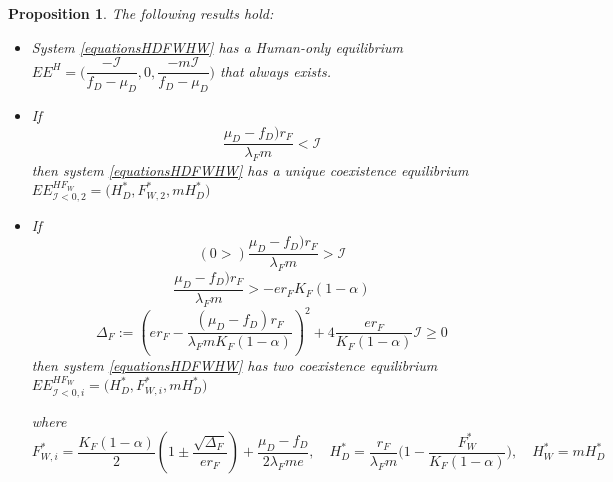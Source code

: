 \documentclass{article}
\newcommand{\lfw}{\lambda_{F}}
\newcommand{\lfw}{\lambda_{F}}
\newcommand{\cI}{\mathcal{I}}
\newtheorem{prop}{Proposition}
\begin{document}
\begin{prop} The following results hold:
\begin{itemize}
\item System \eqref{equationsHDFWHW} has a Human-only equilibrium $EE^{H} = \Big(\dfrac{-\cI}{f_D - \mu_D}, 0, \dfrac{- m \cI}{f_D - \mu_D} \Big)$ that always exists.
\item If $$ \dfrac{\mu_D - f_D)r_F}{\lfw m} < \cI $$ then system \eqref{equationsHDFWHW} has a unique coexistence equilibrium $EE^{HF_W}_{\cI < 0, 2} = \Big(H^*_{D}, F^*_{W, 2}, m H^*_{D} \Big)$

\item If $$(0 > )\dfrac{\mu_D - f_D)r_F}{\lfw m} > \cI $$ 
$$ \dfrac{\mu_D - f_D)r_F}{\lfw m} > - e r_F K_F(1-\alpha)$$
$$ \Delta_F := \left(er_F - \dfrac{(\mu_D - f_D) r_F}{\lfw m K_F(1-\alpha)} \right)^2 + 4\dfrac{er_F}{K_F(1-\alpha)}  \cI \geq 0$$
then system \eqref{equationsHDFWHW} has two coexistence equilibrium $EE^{HF_W}_{\cI < 0, i} = \Big(H^*_{D}, F^*_{W, i}, m H^*_{D} \Big)$

where
$$F^*_{W, i} = \dfrac{K_F(1-\alpha)}{2}\left(1 \pm \dfrac{\sqrt{\Delta_F}}{er_F}\right) + \dfrac{\mu_D - f_D}{2\lfw m e},\quad
H^*_{D} = \dfrac{r_F}{\lfw m} \Big(1 - \dfrac{F^*_{W}}{K_F(1-\alpha)} \Big),
\quad 
H^*_{W} = m H^*_{D}$$
\end{itemize} 

\end{prop}
\end{document}
